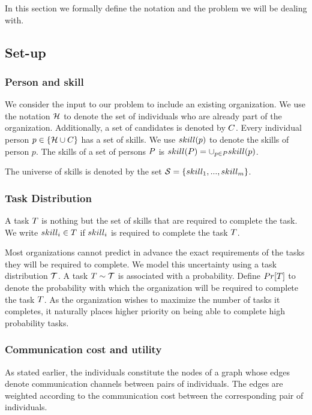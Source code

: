 In this section we formally define the notation and the problem we will be dealing with.
\subsection{Set-up}

\subsubsection{Person and skill}

We consider the input to our problem to include an existing organization.
We use the notation $\mathcal{H}$ to denote the set of individuals who are already part of the organization.
Additionally, a set of candidates is denoted by ${C}$.
Every individual person $p \in \{\mathcal{H} \cup {C}\}$ has a set of skills.
We use $skill(p)$ to denote the skills of person $p$.
The skills of a set of persons $P$ is $skill(P) = \cup_{p \in P} skill(p)$.

The universe of skills is denoted by the set $\mathcal{S} = \{ skill_1, ..., skill_m \}$.

\subsubsection{Task Distribution}

A task $T$ is nothing but the set of skills that are required to complete the task.
We write $skill_i \in T$ if $skill_i$ is required to complete the task $T$.

Most organizations cannot predict in advance the exact requirements of the tasks they will be required to complete.
We model this uncertainty using a task distribution $\mathcal{T}$. 
A task $T \sim \mathcal{T}$ is associated with a probability.
Define $Pr[T]$ to denote the probability with which the organization will be required to complete the task $T$. 
As the organization wishes to maximize the number of tasks it completes, it naturally places higher priority on being able to complete high probability tasks.

\subsubsection{Communication cost and utility}

As stated earlier, the individuals constitute the nodes of a graph whose edges denote communication channels between pairs of individuals.
The edges are weighted according to the communication cost between the corresponding pair of individuals.

